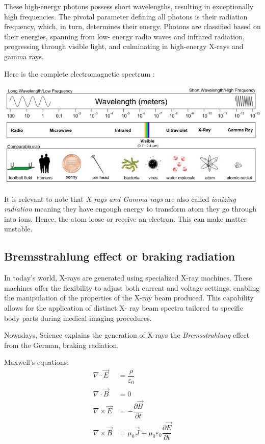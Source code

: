\documentclass[a4paper,12pt]{report}
\begin{document}
These high-energy photons possess short wavelengths, resulting in exceptionally high
frequencies. The pivotal parameter defining all photons is their radiation frequency, which, in
turn, determines their energy. Photons are classified based on their energies, spanning from low-
energy radio waves and infrared radiation, progressing through visible light, and culminating in
high-energy X-rays and gamma rays.
\newpage

Here is the complete electromagnetic spectrum :
\begin{center}
\includegraphics[scale = 2.4]{elecSpec.jpg}
\end{center}

It is relevant to note that \textit{X-rays and Gamma-rays} are also called \textit{ionizing radiation} meaning they have engough energy to transform atom they go through into ions. Hence, the atom loose or receive an electron. This can make matter unstable.

\subsection*{Bremsstrahlung effect or braking radiation}

In today's world, X-rays are generated using specialized X-ray machines. These machines offer
the flexibility to adjust both current and voltage settings, enabling the manipulation of the
properties of the X-ray beam produced. This capability allows for the application of distinct X-
ray beam spectra tailored to specific body parts during medical imaging procedures.

Nowadays, Science explains the generation of X-rays  the \textit{Bremsstrahlung }effect from the German, braking radiation. 


Maxwell's equations:
\begin{align}
  \nabla \cdot \vec{E} &= \dfrac{\rho}{\varepsilon_0} \\
  \nabla \cdot \vec{B} &= 0 \\
  \nabla \times \vec{E} &= -\dfrac{\partial \vec{B}}{\partial t} \\
  \nabla \times \vec{B} &= \mu_0 \vec{J} + \mu_0 \varepsilon_0 \dfrac{\partial \vec{E}}{\partial t}
\end{align}
\end{document}
